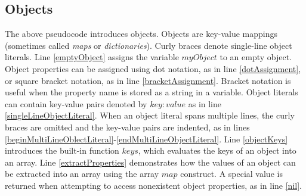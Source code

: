 \subsection{Objects}\label{objects}

The above pseudocode introduces objects. Objects are key-value mappings (sometimes called \emph{maps} or \emph{dictionaries}). Curly braces denote single-line object literals. Line \ref{emptyObject} assigns the variable $myObject$ to an empty object. Object properties can be assigned using dot notation, as in line \ref{dotAssignment}, or square bracket notation, as in line \ref{bracketAssignment}. Bracket notation is useful when the property name is stored as a string in a variable. Object literals can contain key-value pairs denoted by $key: value$ as in line \ref{singleLineObjectLiteral}. When an object literal spans multiple lines, the curly braces are omitted and the key-value pairs are indented, as in lines \ref{beginMultiLineOblectLiteral}-\ref{endMultiLineObjectLiteral}. Line \ref{objectKeys} introduces the built-in function $keys$, which evaluates the keys of an object into an array. Line \ref{extractProperties} demonstrates how the values of an object can be extracted into an array using the array $map$ construct. A special value  is returned when attempting to access nonexistent object properties, as in line \ref{nil}.

